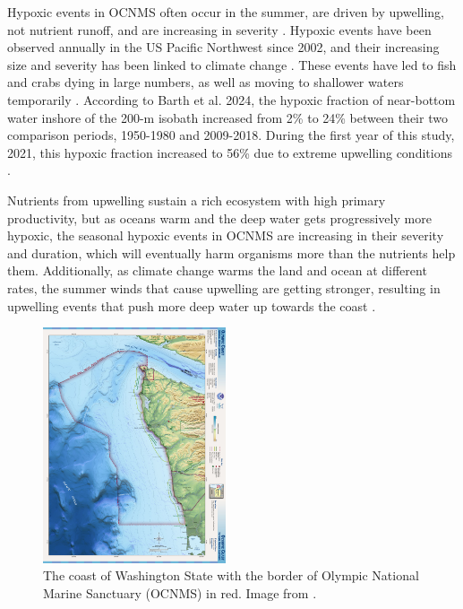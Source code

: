 \documentclass[12pt,twoside]{reedthesis}
\begin{document}
Hypoxic events in OCNMS often occur in the summer, are driven by upwelling, not nutrient runoff, and are increasing in severity \autocite{Barth2024}. Hypoxic events have been observed annually in the US Pacific Northwest since 2002, and their increasing size and severity has been linked to climate change \autocite{Bograd2023, Parks2009}. These events have led to fish and crabs dying in large numbers, as well as moving to shallower waters temporarily \autocite{Grantham2004}. According to Barth et al. 2024, the hypoxic fraction of near-bottom water inshore of the 200-m isobath increased from 2\% to 24\% between their two comparison periods, 1950-1980 and 2009-2018. During the first year of this study, 2021, this hypoxic fraction increased to 56\% due to extreme upwelling conditions \autocite{Barth2024}. 

Nutrients from upwelling sustain a rich ecosystem with high primary productivity, but as oceans warm and the deep water gets progressively more hypoxic, the seasonal hypoxic events in OCNMS are increasing in their severity and duration, which will eventually harm organisms more than the nutrients help them. Additionally, as climate change warms the land and ocean at different rates, the summer winds that cause upwelling are getting stronger, resulting in upwelling events that push more deep water up towards the coast \autocite{Barth2024}. 

\begin{figure}
	\begin{center}
		\includegraphics[width=0.48\textwidth]{Fig_OCNMS_Map}
		\caption[Map of OCNMS]{\footnotesize{The coast of Washington State with the border of Olympic National Marine Sanctuary (OCNMS) in red. Image from .}} %
		\label{OCNMSMap}
	\end{center}
\end{figure} 
\end{document}
